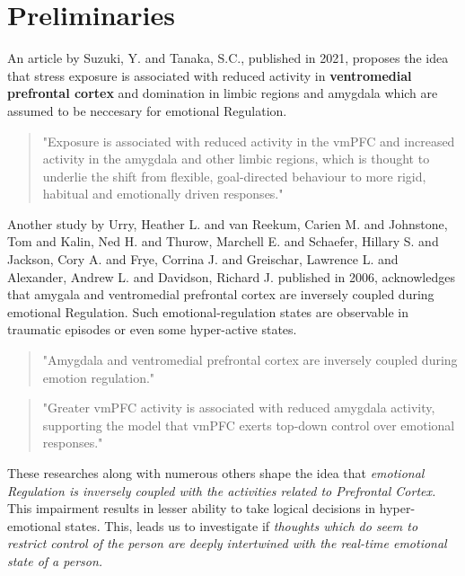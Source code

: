 \section{Preliminaries}
An article by Suzuki, Y. and Tanaka, S.C., \cite{suzuki2021} published in 2021, proposes the idea that stress exposure is associated with reduced activity in \textbf{ventromedial prefrontal cortex} and domination in limbic regions and amygdala which are assumed to be neccesary for emotional Regulation.

\begin{quote}
"Exposure is associated with reduced activity in the vmPFC and increased activity in the amygdala and other limbic regions, which is thought to underlie the shift from flexible, goal-directed behaviour to more rigid, habitual and emotionally driven responses."
\end{quote} 

Another study by Urry, Heather L. and van Reekum, Carien M. and Johnstone, Tom and Kalin, Ned H. and Thurow, Marchell E. and Schaefer, Hillary S. and Jackson, Cory A. and Frye, Corrina J. and Greischar, Lawrence L. and Alexander, Andrew L. and Davidson, Richard J. \cite{Urry2006} published in 2006, acknowledges that amygala and ventromedial prefrontal cortex are inversely coupled during emotional Regulation. Such emotional-regulation states are observable in traumatic episodes or even some hyper-active states.

\begin{quote}
"Amygdala and ventromedial prefrontal cortex are inversely coupled during emotion regulation."
\end{quote}
\begin{quote}
"Greater vmPFC activity is associated with reduced amygdala activity, supporting the model that vmPFC exerts top-down control over emotional responses."
\end{quote}

These researches along with numerous others shape the idea that \emph{emotional Regulation is inversely coupled with the activities related to Prefrontal Cortex.}
This impairment results in lesser ability to take logical decisions in hyper-emotional states. This, leads us to investigate if \emph{thoughts which do seem to restrict control of the person are deeply intertwined with the real-time emotional state of a person.}
